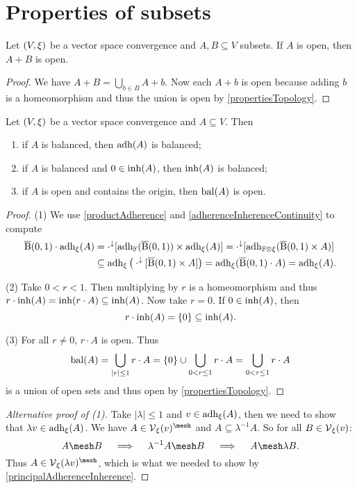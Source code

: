 \section{Properties of subsets}
\begin{lemma} \label{sumOpenSetsOpen}
Let $\sSet{V,\xi}$ be a vector space convergence and $A,B\subseteq V$ subsets. If $A$ is open, then $A+B$ is open.
\end{lemma}
\begin{proof}
We have $A + B = \bigcup_{b\in B} A+b$. Now each $A+b$ is open because adding $b$ is a homeomorphism and thus the union is open by \ref{propertiesTopology}.
\end{proof}

\begin{proposition} \label{inherenceAdherenceBalanced}
Let $\sSet{V,\xi}$ be a vector space convergence and $A\subseteq V$. Then
\begin{enumerate}
\item if $A$ is balanced, then $\operatorname{adh}(A)$ is balanced;
\item if $A$ is balanced and $0\in\operatorname{inh}(A)$, then $\operatorname{inh}(A)$ is balanced;
\item if $A$ is open and contains the origin, then $\operatorname{bal}(A)$ is open.
\end{enumerate}
\end{proposition}
\begin{proof}
(1) We use \ref{productAdherence} and \ref{adherenceInherenceContinuity} to compute
\begin{align*}
\operatorname{\overline{B}}(0,1)\cdot \operatorname{adh}_\xi(A) &= \cdot^\downarrow[\operatorname{adh}_{\mathbb{F}}(\operatorname{\overline{B}}(0,1))\times \operatorname{adh}_\xi(A)] = \cdot^\downarrow[\operatorname{adh}_{\mathbb{F}\otimes \xi}(\operatorname{\overline{B}}(0,1)\times A)] \\
&\subseteq \operatorname{adh}_{\xi}\big(\cdot^\downarrow[\operatorname{\overline{B}}(0,1)\times A]\big) = \operatorname{adh}_{\xi}(\operatorname{\overline{B}}(0,1)\cdot A) = \operatorname{adh}_\xi(A).
\end{align*}

(2) Take $0<r<1$. Then multiplying by $r$ is a homeomorphism and thus $r\cdot\operatorname{inh}(A) = \operatorname{inh}(r\cdot A) \subseteq \operatorname{inh}(A)$. Now take $r=0$. If $0\in\operatorname{inh}(A)$, then
\[ r\cdot\operatorname{inh}(A) = \{0\} \subseteq \operatorname{inh}(A). \]

(3) For all $r\neq 0$, $r\cdot A$ is open. Thus
\[ \operatorname{bal}(A) = \bigcup_{|r|\leq 1}r\cdot A = \{0\}\cup \bigcup_{0< r\leq 1}r\cdot A = \bigcup_{0< r\leq 1}r\cdot A \]
is a union of open sets and thus open by \ref{propertiesTopology}.
\end{proof}
\begin{proof}[Alternative proof of (1)]
Take $|\lambda|\leq 1$ and $v\in \operatorname{adh}_\xi(A)$, then we need to show that $\lambda v \in \operatorname{adh}_\xi(A)$. We have $A\in \vicinity_\xi(v)^{\mesh}$ and $A\subseteq \lambda^{-1}A$. So for all $B\in \operatorname{\mathcal{V}}_\xi(v)$:
\[ A\mesh B \quad\implies\quad \lambda^{-1}A\mesh B \quad\implies\quad A\mesh \lambda B. \]
Thus $A\in \vicinity_\xi(\lambda v)^{\mesh}$, which is what we needed to show by \ref{principalAdherenceInherence}.
\end{proof}


